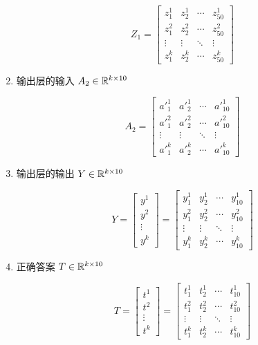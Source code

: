 \documentclass[12pt,a4paper]{amsart}
\begin{document}
\begin{enumerate}
		\begin{equation}
			Z_1 = \begin{bmatrix}
				z_1^1  & z_2^1  & \cdots & z_{50}^1 \\
				z_1^2  & z_2^2  & \cdots & z_{50}^2 \\
				\vdots & \vdots & \ddots & \vdots    \\
				z_1^k  & z_2^k  & \cdots & z_{50}^k
			\end{bmatrix}
		\end{equation}

	\item 输出层的输入 $A_2 \in \mathbb{R}^{k \times 10}$

		\begin{equation}
			A_2 = \begin{bmatrix}
				{a'}_1^1 & {a'}_2^1 & \cdots & {a'}_{10}^1 \\
				{a'}_1^2 & {a'}_2^2 & \cdots & {a'}_{10}^2 \\
				\vdots   & \vdots   & \ddots & \vdots      \\
				{a'}_1^k & {a'}_2^k & \cdots & {a'}_{10}^k
			\end{bmatrix}
		\end{equation}

	\item 输出层的输出 $Y \in \mathbb{R}^{k \times 10}$

		\begin{equation}
			Y = \begin{bmatrix}
				y^1    \\
				y^2    \\
				\vdots \\
				y^k
			\end{bmatrix} = \begin{bmatrix}
				y_1^1  & y_2^1  & \cdots & y_{10}^1 \\
				y_1^2  & y_2^2  & \cdots & y_{10}^2 \\
				\vdots & \vdots & \ddots & \vdots    \\
				y_1^k  & y_2^k  & \cdots & y_{10}^k
			\end{bmatrix}
		\end{equation}

	\item 正确答案 $T \in \mathbb{R}^{k\times 10}$

		\begin{equation}
			T = \begin{bmatrix}
				t^1    \\
				t^2    \\
				\vdots \\
				t^k
			\end{bmatrix} = \begin{bmatrix}
				t_1^1  & t_2^1  & \cdots & t_{10}^1 \\
				t_1^2  & t_2^2  & \cdots & t_{10}^2 \\
				\vdots & \vdots & \ddots & \vdots    \\
				t_1^k  & t_2^k  & \cdots & t_{10}^k
			\end{bmatrix}
		\end{equation}

\end{enumerate}
\end{document}
